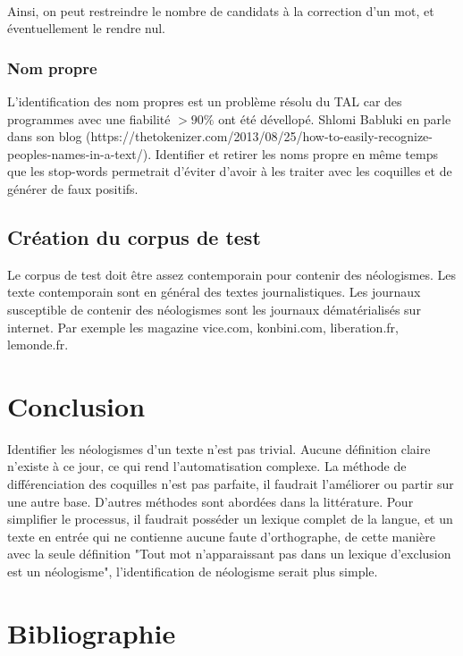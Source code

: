 \documentclass{article}
\begin{document}
\paragraph*{}
Ainsi, on peut restreindre le nombre de candidats à la correction d'un mot, et éventuellement le rendre nul.


\subsubsection{Nom propre}
L’identification des nom propres est un problème résolu du TAL car des programmes avec une fiabilité $> 90\%$ ont été dévellopé. Shlomi Babluki en parle dans son blog (https://thetokenizer.com/2013/08/25/how-to-easily-recognize-peoples-names-in-a-text/). Identifier et retirer les noms propre en même temps que les stop-words permetrait d'éviter d'avoir à les traiter avec les coquilles et de générer de faux positifs.

\paragraph*{}
\subsection{Création du corpus de test}
Le corpus de test doit être assez contemporain pour contenir des néologismes. Les texte contemporain sont en général des textes journalistiques. Les journaux susceptible de contenir des néologismes sont les journaux dématérialisés sur internet. Par exemple les magazine vice.com, konbini.com, liberation.fr, lemonde.fr.

\section*{Conclusion}
Identifier les néologismes d'un texte n'est pas trivial. Aucune définition claire n'existe à ce jour, ce qui rend l'automatisation complexe. La méthode de différenciation des coquilles n'est pas parfaite, il faudrait l'améliorer ou partir sur une autre base. D'autres méthodes sont abordées dans la littérature. Pour simplifier le processus, il faudrait posséder un lexique complet de la langue, et un texte en entrée qui ne contienne aucune faute d'orthographe, de cette manière avec la seule définition "Tout mot n’apparaissant pas dans un lexique d'exclusion est un néologisme", l'identification de néologisme serait plus simple.

\section*{Bibliographie}
\end{document}
